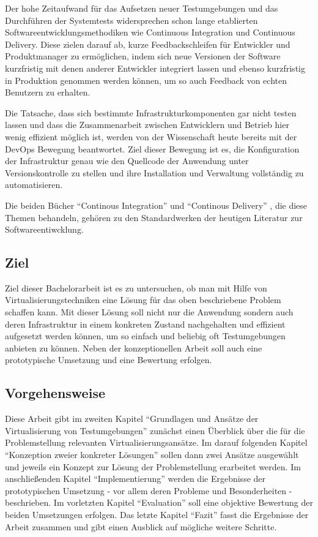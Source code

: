 Der hohe Zeitaufwand für das Aufsetzen neuer Testumgebungen und das Durchführen der Systemtests widersprechen schon lange etablierten Softwareentwicklungsmethodiken wie Continuous Integration und Continuous Delivery. Diese zielen darauf ab, kurze Feedbackschleifen für Entwickler und Produktmanager zu ermöglichen, indem sich neue Versionen der Software kurzfristig mit denen anderer Entwickler integriert lassen und ebenso kurzfristig in Produktion genommen werden können, um so auch Feedback von echten Benutzern zu erhalten.

Die Tatsache, dass sich bestimmte Infrastrukturkomponenten gar nicht testen lassen und dass die Zusammenarbeit zwischen Entwicklern und Betrieb hier wenig effizient möglich ist, werden von der Wissenschaft heute bereits mit der DevOps Bewegung beantwortet. Ziel dieser Bewegung ist es, die Konfiguration der Infrastruktur genau wie den Quellcode der Anwendung unter Versionskontrolle zu stellen und ihre Installation und Verwaltung vollständig zu automatisieren.

Die beiden Bücher "`Continous Integration"' \citep{DuvMatAnd07} und "`Continous Delivery"' \citep{HumFar10}, die diese Themen behandeln, gehören zu den Standardwerken der heutigen Literatur zur Softwareentiwcklung.

\subsection{Ziel}

Ziel dieser Bachelorarbeit ist es zu untersuchen, ob man mit Hilfe von Virtualisierungstechniken eine Lösung für das oben beschriebene Problem schaffen kann. Mit dieser Lösung soll nicht nur die Anwendung sondern auch deren Infrastruktur in einem konkreten Zustand nachgehalten und effizient aufgesetzt werden können, um so einfach und beliebig oft Testumgebungen anbieten zu können. Neben der konzeptionellen Arbeit soll auch eine prototypische Umsetzung und eine Bewertung erfolgen.

\subsection{Vorgehensweise}

Diese Arbeit gibt im zweiten Kapitel "`Grundlagen und Ansätze der Virtualisierung von Testumgebungen"' zunächst einen Überblick über die für die Problemstellung relevanten Virtualisierungsansätze. Im darauf folgenden Kapitel "`Konzeption zweier konkreter Lösungen"' sollen dann zwei Ansätze ausgewählt und jeweils ein Konzept zur Lösung der Problemstellung erarbeitet werden. Im anschließenden Kapitel "`Implementierung"' werden die Ergebnisse der prototypischen Umsetzung - vor allem deren Probleme und Besonderheiten - beschrieben. Im vorletzten Kapitel "`Evaluation"' soll eine objektive Bewertung der beiden Umsetzungen erfolgen. Das letzte Kapitel "`Fazit"' fasst die Ergebnisse der Arbeit zusammen und gibt einen Ausblick auf mögliche weitere Schritte.
